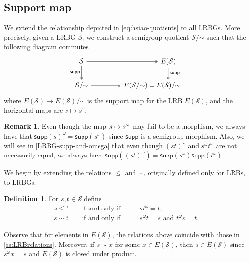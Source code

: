 \documentclass[11pt, oneside, reqno]{amsart}
\theoremstyle{definition}
\newtheorem{definition}[theorem]{Definition}
\newtheorem{remark}[theorem]{Remark}
\numberwithin{equation}{section}
\def \SS{{\mathcal{S}}}
\def\qqiff{\qquad\text{if and only if}\qquad}
\def \supp{\mathsf{supp}}
\begin{document}
\subsection{Support map}\label{ss:sLRBGrelations}

We extend the relationship depicted in \cref{eq:hsiao-quotients} to all LRBGs.
More precisely, given a LRBG $\SS$, we construct a semigroup quotient $\SS/\mathord{\sim}$
such that the following diagram commutes
\begin{equation}\label{eq:LRBG-quotients-commuative-diagram}
    \begin{tikzcd}
        \SS \arrow[d, two heads, "\supp"'] \arrow[rr, two heads] &[2em] &[-3em] E(\SS) \arrow[d, "\supp", two heads] \\
        \SS/\mathord{\sim} \arrow[r, two heads]    & E(\SS/\mathord{\sim}) = & E(\SS)/\mathord{\sim}
        \end{tikzcd}
\end{equation}
where $E(\SS) \xrightarrow{} E(\SS)/\mathord{\sim}$ is the support map for the LRB $E(\SS)$,
and the horizontal maps are $s \mapsto s^\omega$.

\begin{remark}
    Even though the map $s \xmapsto{} s^\omega$ may fail to be
    a morphism, we always have that $\supp(s)^\omega = \supp(s^\omega)$
    since $\supp$ is a semigroup morphism.
    Also, we will see in \cref{LRBG-supp-and-omega}
    that even though $(st)^\omega$ and $s^\omega t^\omega$
    are not necessarily equal, we always have
    $\supp((st)^\omega) = \supp(s^\omega) \supp(t^\omega)$.
\end{remark}

We begin by extending the relations $\leq$ and $\sim$, originally defined only for LRBs, to LRBGs.

\begin{definition}\label{def:sLRBGrelations}
    For $s,t \in \SS$ define
    \begin{align}
        \label{eq:poset-S} s \leq t         \qqiff &          s t^\omega = t;\\
        \label{eq:equiv-S} s \sim t         \qqiff &          s^\omega t = s \text{ and } t^\omega s = t.
    \end{align}
\end{definition}

Observe that for elements in $E(\SS)$, the relations above coincide with those in \cref{ss:LRBrelations}.
Moreover, if $s \sim x$ for some $x \in E(\SS)$, then $s \in E(\SS)$ since $s^\omega x = s$ and $E(\SS)$ is closed under product.
\end{document}
